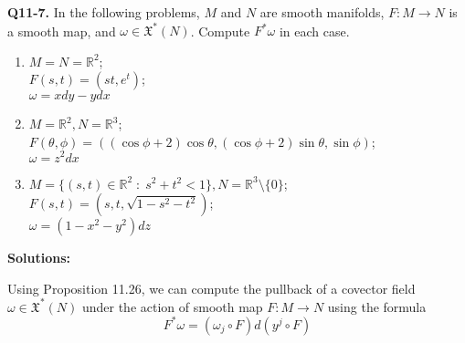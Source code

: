 \documentclass{article}
\newcommand{\R}{\mathbb{R}}
\begin{document}
\textbf{Q11-7.} In the following problems, $M$ and $N$ are smooth manifolds, $F : M \rightarrow N$ is a smooth map, and $\omega \in \mathfrak{X}^*(N)$. Compute $F^* \omega$ in each case.
\begin{enumerate}[label=(\alph*)]
  \item $M = N = \R^2$; \\ $F(s, t) = \left(st, e^t\right)$; \\$\omega = xdy - ydx$
  \item $M = \R^2, N = \R^3$; \\$F(\theta, \phi) = \left( \left(\cos\phi + 2\right)\cos\theta, \left(\cos\phi + 2\right)\sin\theta, \sin\phi \right)$; \\$\omega =z^2 dx$
  \item $M = \{(s, t) \in \R^2 \;:\;s^2 + t^2 < 1 \}, N = \R^3 \setminus \{0\}$; \\$F(s,t) = \left( s, t, \sqrt{1-s^2-t^2} \right)$; \\$\omega = \left(1-x^2-y^2\right)dz$
\end{enumerate} 

\vskip 0.5cm
\textbf{Solutions:}

Using Proposition 11.26, we can compute the pullback of a covector field $\omega \in \mathfrak{X}^*(N)$ under the action of smooth map $F : M \rightarrow N$ using the formula
\[ F^* \omega = \left(\omega_j \circ F\right) d \left(y^j \circ F\right) \]
\end{document}
